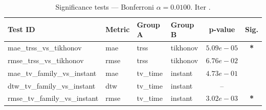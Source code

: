 ﻿%
\begin{table}[ht]
\centering
\caption[EEG reconstruction - Iteration it37]{Significance tests — Bonferroni $\alpha=0.0100$. Iter .}
\label{tab:sig_it37_3syn_alpha_low_missing}
\small
\begin{tabular}{llllcc}
\toprule
Test ID & Metric & Group A & Group B & p-value & Sig. \\
\midrule
mae\_trss\_vs\_tikhonov & mae & trss & tikhonov & $5.09e-05$ & \textbf{*} \\
rmse\_trss\_vs\_tikhonov & rmse & trss & tikhonov & $6.76e-02$ &  \\
mae\_tv\_family\_vs\_instant & mae & tv\_time & instant & $4.73e-01$ &  \\
dtw\_tv\_family\_vs\_instant & dtw & tv\_time & instant & -- &  \\
rmse\_tv\_family\_vs\_instant & rmse & tv\_time & instant & $3.02e-03$ & \textbf{*} \\
\bottomrule
\end{tabular}
\end{table}







